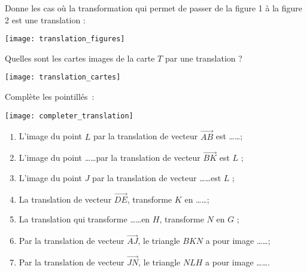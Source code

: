 

\begin{exercice}
Donne les cas où la transformation qui permet de passer de la figure 1 à la figure 2 est une translation :
\begin{center} \texttt{[image: translation\_figures]} \end{center}
\end{exercice}


\begin{exercice}
Quelles sont les cartes images de la carte $T$ par une translation ?
\begin{center} \texttt{[image: translation\_cartes]} \end{center}
\end{exercice}

\columnbreak

\begin{exercice}
Complète les pointillés :
\begin{center} \texttt{[image: completer\_translation]} \end{center}
\begin{enumerate}
 \item L’image du point $L$ par la translation de vecteur $\overrightarrow{AB}$ est \ldots \ldots ;
 \item L’image du point \ldots \ldots par la translation de vecteur $\overrightarrow{BK}$ est $L$ ;
 \item L’image du point $J$ par la translation de vecteur \ldots \ldots est $L$ ;
 \item La translation de vecteur $\overrightarrow{DE}$, transforme $K$ en \ldots \ldots ;
 \item La translation qui transforme \ldots \ldots en $H$, transforme $N$ en $G$ ;
 \item Par la translation de vecteur $\overrightarrow{AJ}$, le triangle $BKN$ a pour image \ldots \ldots ;
 \item Par la translation de vecteur $\overrightarrow{JN}$, le triangle $NLH$ a pour image \ldots \ldots.
 \end{enumerate}
\end{exercice}


